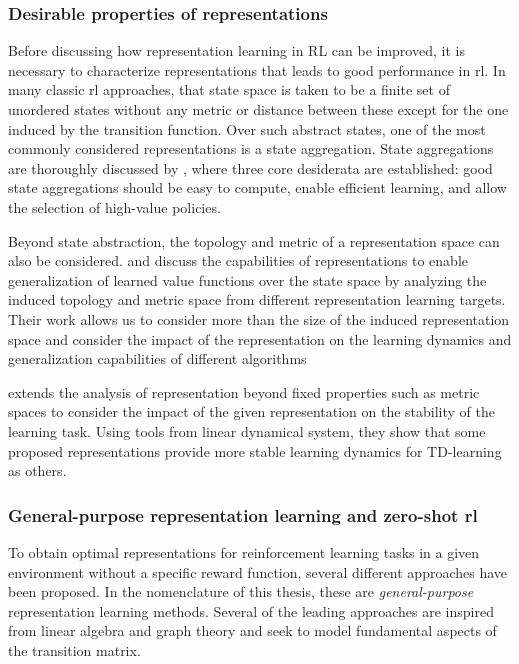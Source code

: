 \subsubsection{Desirable properties of representations}

Before discussing how representation learning in RL can be improved, it is necessary to characterize representations that leads to good performance in \ac{rl}.
In many classic \ac{rl} approaches, that state space is taken to be a finite set of unordered states without any metric or distance between these except for the one induced by the transition function.
Over such abstract states, one of the most commonly considered representations is a state aggregation.
State aggregations are thoroughly discussed by \textcite{abel2020thesis}, where three core desiderata are established: good state aggregations should be easy to compute, enable efficient learning, and allow the selection of high-value policies.

Beyond state abstraction, the topology and metric of a representation space can also be considered. 
\textcite{le2021metrics} and \textcite{lelan2022generalization} discuss the capabilities of representations to enable generalization of learned value functions over the state space by analyzing the induced topology and metric space from different representation learning targets.
Their work allows us to consider more than the size of the induced representation space and consider the impact of the representation on the learning dynamics and generalization capabilities of different algorithms

\textcite{ghosh2020representations} extends the analysis of representation beyond fixed properties such as metric spaces to consider the impact of the given representation on the stability of the learning task.
Using tools from linear dynamical system, they show that some proposed representations provide more stable learning dynamics for TD-learning as others.

\subsubsection{General-purpose representation learning and zero-shot \ac{rl}}

To obtain optimal representations for reinforcement learning tasks in a given environment without a specific reward function, several different approaches have been proposed.
In the nomenclature of this thesis, these are \emph{general-purpose} representation learning methods.
Several of the leading approaches are inspired from linear algebra and graph theory and seek to model fundamental aspects of the transition matrix.

